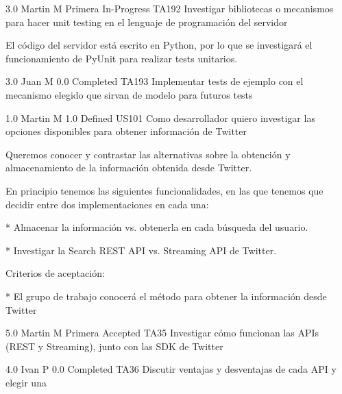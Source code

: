	{} %
	{3.0} %
	{Martin M} %
	{Primera} %
	{In-Progress} %
	\task
		{TA192} %
		{Investigar bibliotecas o mecanismos para hacer unit testing en el lenguaje de programación del servidor} %
		{El código del servidor está escrito en Python, por lo que se investigará el
funcionamiento de PyUnit para realizar tests unitarios.

} %
		{3.0} %
		{Juan M} %
		{0.0} %
		{Completed} %
	\task
		{TA193} %
		{Implementar tests de ejemplo con el mecanismo elegido que sirvan de modelo para futuros tests} %
		{

} %
		{1.0} %
		{Martin M} %
		{1.0} %
		{Defined} %
\userStory
	{US101} %
	{Como desarrollador quiero investigar las opciones disponibles para obtener información de Twitter} %
	{Queremos conocer y contrastar las alternativas sobre la obtención y
almacenamiento de la información obtenida desde Twitter.

  
En principio tenemos las siguientes funcionalidades, en las que tenemos que
decidir entre dos implementaciones en cada una:

* Almacenar la información vs. obtenerla en cada búsqueda del usuario.

* Investigar la Search REST API vs. Streaming API de Twitter.

  

Criterios de aceptación:

* El grupo de trabajo conocerá el método para obtener la información desde Twitter  

} %
	{} %
	{5.0} %
	{Martin M} %
	{Primera} %
	{Accepted} %
	\task
		{TA35} %
		{Investigar cómo funcionan las APIs (REST y Streaming), junto con las SDK de Twitter} %
		{

} %
		{4.0} %
		{Ivan P} %
		{0.0} %
		{Completed} %
	\task
		{TA36} %
		{Discutir ventajas y desventajas de cada API y elegir una} %
		{

} %
